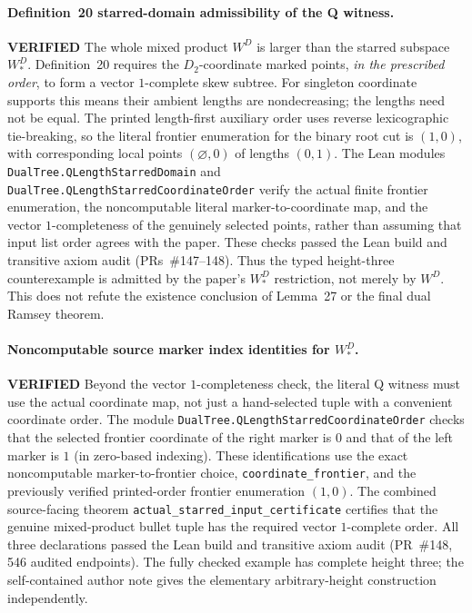 \documentclass[11pt]{article}
\newcommand{\ok}{\textcolor{green!40!black}{\textbf{VERIFIED}}}
\newcommand{\lean}[1]{\texttt{#1}}
\begin{document}
\paragraph{Definition~20 starred-domain admissibility of the Q witness.} \ok
The whole mixed product $W^D$ is larger than the starred subspace
$W^D_*$. Definition~20 requires the $D_2$-coordinate marked
points, \emph{in the prescribed order}, to form a vector
$1$-complete skew subtree. For singleton coordinate supports
this means their ambient lengths are nondecreasing; the lengths
need not be equal. The printed length-first auxiliary order uses
reverse lexicographic tie-breaking, so the literal frontier
enumeration for the binary root cut is $(1,0)$, with corresponding
local points $(\varnothing,0)$ of lengths $(0,1)$.
The Lean modules
\lean{DualTree.QLengthStarredDomain} and
\lean{DualTree.QLengthStarredCoordinateOrder}
verify the actual finite frontier enumeration, the noncomputable
literal marker-to-coordinate map, and the vector $1$-completeness
of the genuinely selected points, rather than assuming that
input list order agrees with the paper. These checks passed the
Lean build and transitive axiom audit (PRs~\#147--148).
Thus the typed height-three counterexample is admitted by the
paper's $W^D_*$ restriction, not merely by $W^D$.
This does not refute the existence conclusion of Lemma~27 or
the final dual Ramsey theorem.

\paragraph{Noncomputable source marker index identities for $W^D_*$.} \ok
Beyond the vector $1$-completeness check, the literal
Q witness must use the actual coordinate map, not just a
hand-selected tuple with a convenient coordinate order.
The module
\lean{DualTree.QLengthStarredCoordinateOrder}
checks that the selected frontier coordinate of the
right marker is $0$ and that of the left marker is $1$
(in zero-based indexing). These identifications use
the exact noncomputable marker-to-frontier choice,
\lean{coordinate_frontier}, and the previously verified
printed-order frontier enumeration $(1,0)$.
The combined source-facing theorem
\lean{actual_starred_input_certificate}
certifies that the genuine mixed-product bullet tuple
has the required vector $1$-complete order. All three
declarations passed the Lean build and transitive axiom
audit (PR~\#148, 546 audited endpoints).
The fully checked example has complete height three;
the self-contained author note gives the elementary
arbitrary-height construction independently.
\end{document}

